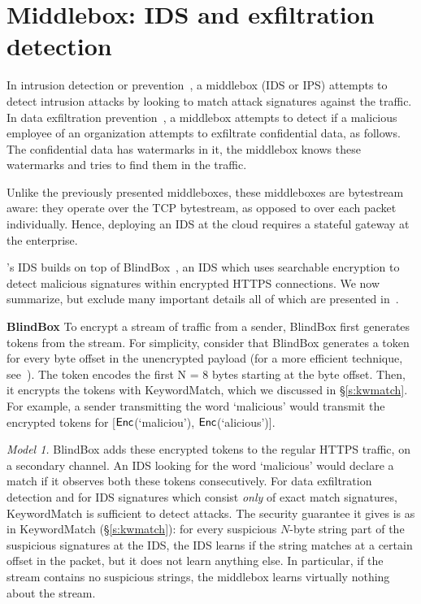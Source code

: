 


\section{Middlebox: IDS and exfiltration detection}\label{sec:ids}

In intrusion detection or prevention~\cite{Snort}, a middlebox (IDS or IPS) attempts to detect intrusion attacks by looking to match attack signatures against the traffic.
In data exfiltration prevention~\cite{CMU_exfiltration_report}, a middlebox attempts to detect if a malicious employee of an organization 
attempts to exfiltrate confidential data, as follows.  The confidential data has watermarks in it, the middlebox knows these watermarks and tries to find them
in the traffic. 

Unlike the previously presented middleboxes, these middleboxes are bytestream aware:  they operate over the TCP bytestream, as opposed to over each packet individually. Hence, deploying an IDS at the cloud requires a stateful gateway at the enterprise.

\sys's IDS builds on top of BlindBox~\cite{blindbox}, an IDS which uses searchable encryption to detect malicious signatures within encrypted HTTPS connections. We now  summarize, but exclude many important details all of which are presented in~\cite{blindbox}.

\noindent\textbf{BlindBox}
To encrypt a stream of traffic from a sender, BlindBox first generates tokens from the stream.  
For simplicity, consider that BlindBox generates a token for  every byte offset in the unencrypted payload (for a more efficient technique, see~\cite{blindbox}). 
The  token encodes the first N = 8 bytes starting at the byte offset. Then, it encrypts the tokens with KeywordMatch, which we discussed in \S\ref{s:kwmatch}.
For example, a sender transmitting the word `malicious' would transmit the encrypted tokens for [$\mathsf{Enc}$(`maliciou'), $\mathsf{Enc}$(`alicious')].

 {\em Model 1.} BlindBox adds these encrypted tokens to the  regular HTTPS traffic, on  a secondary channel.
An IDS looking for the word `malicious' would declare a match if it observes both these tokens consecutively.
For data exfiltration detection and for IDS signatures which consist {\it only} of exact match signatures, KeywordMatch is sufficient to detect attacks.
The security guarantee it gives is as in KeywordMatch (\S\ref{s:kwmatch}): for every suspicious $N$-byte string part of the suspicious signatures at the IDS, the IDS learns if the string matches at a certain offset in the packet, but it does not learn anything else. In particular, if the stream contains no suspicious strings, the middlebox learns virtually nothing about the stream. 

